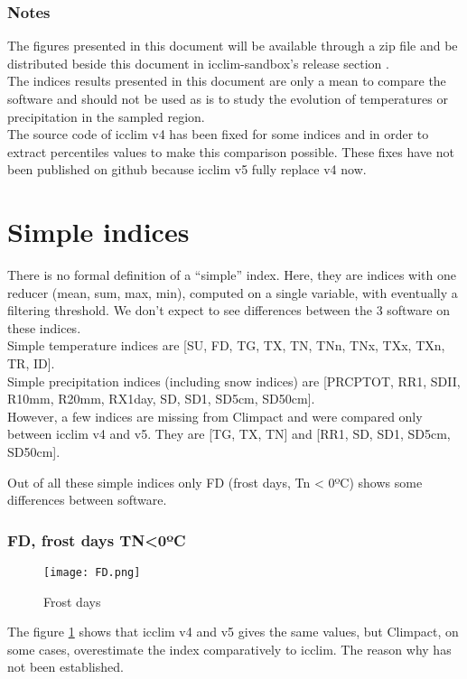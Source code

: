\documentclass[a4paper,11pt]{article}
\begin{document}
    \section{Notes}
        The figures presented in this document will be available through a zip file and be distributed beside this document in icclim-sandbox's release section \cite{gh/icclim_sandbox}.\\
        The indices results presented in this document are only a mean to compare the software and should not be used as is to study the evolution of temperatures or precipitation in the sampled region.\\
        The source code of icclim v4 has been fixed for some indices and in order to extract percentiles values to make this comparison possible. These fixes have not been published on github because icclim v5 fully replace v4 now.


\part{Simple indices}
    There is no formal definition of a “simple” index. Here, they are indices with one reducer (mean, sum, max, min), computed on a single variable, with eventually a filtering threshold. 
    We don't expect to see differences between the 3 software on these indices.\\
    Simple temperature indices are [SU, FD, TG, TX, TN, TNn, TNx, TXx, TXn, TR, ID].\\
    Simple precipitation indices (including snow indices) are [PRCPTOT, RR1, SDII, R10mm, R20mm, RX1day, SD, SD1, SD5cm, SD50cm].\\

    However, a few indices are missing from Climpact and were compared only between icclim v4 and v5. 
    They are [TG, TX, TN] and [RR1, SD, SD1, SD5cm, SD50cm].

    Out of all these simple indices only FD (frost days, Tn < 0ºC) shows some differences between software.

    \section{FD, frost days TN<0ºC}
        \begin{figure}[h]
            \centering
            \texttt{[image: FD.png]}
            \caption{Frost days}
            \label{figure/fd}
        \end{figure}
        The figure \ref{figure/fd} shows that icclim v4 and v5 gives the same values, but Climpact, on some cases, overestimate the index comparatively to icclim.
        The reason why has not been established.
        
\end{document}
